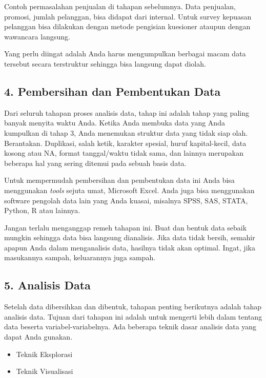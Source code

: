 \documentclass[openany]{book}
\providecommand{\tightlist}{%
  \setlength{\itemsep}{0pt}\setlength{\parskip}{0pt}}
\begin{document}
Contoh permasalahan penjualan di tahapan sebelumnya. Data penjualan,
promosi, jumlah pelanggan, bisa didapat dari internal. Untuk survey
kepuasan pelanggan bisa dilakukan dengan metode pengisian kuesioner
ataupun dengan wawancara langsung.

Yang perlu diingat adalah Anda harus mengumpulkan berbagai macam data
tersebut secara terstruktur sehingga bisa langsung dapat diolah.

\subsection*{4. Pembersihan dan Pembentukan
Data}\label{pembersihan-dan-pembentukan-data}

Dari seluruh tahapan proses analisis data, tahap ini adalah tahap yang
paling banyak menyita waktu Anda. Ketika Anda membuka data yang Anda
kumpulkan di tahap 3, Anda menemukan struktur data yang tidak siap olah.
Berantakan. Duplikasi, salah ketik, karakter spesial, huruf
kapital-kecil, data kosong atau NA, format tanggal/waktu tidak sama, dan
lainnya merupakan beberapa hal yang sering ditemui pada sebuah basis
data.

Untuk mempermudah pembersihan dan pembentukan data ini Anda bisa
menggunakan \emph{tools} sejuta umat, Microsoft Excel. Anda juga bisa
menggunakan software pengolah data lain yang Anda kuasai, misalnya SPSS,
SAS, STATA, Python, R atau lainnya.

Jangan terlalu menganggap remeh tahapan ini. Buat dan bentuk data sebaik
mungkin sehingga data bisa langsung dianalisis. Jika data tidak bersih,
semahir apapun Anda dalam menganalisis data, hasilnya tidak akan
optimal. Ingat, jika masukannya sampah, keluarannya juga sampah.

\subsection*{5. Analisis Data}\label{analisis-data}

Setelah data dibersihkan dan dibentuk, tahapan penting berikutnya adalah
tahap analisis data. Tujuan dari tahapan ini adalah untuk mengerti lebih
dalam tentang data beserta variabel-variabelnya. Ada beberapa teknik
dasar analisis data yang dapat Anda gunakan.

\begin{itemize}
\tightlist
\item
  Teknik Eksplorasi
\item
  Teknik Visualisasi
\end{itemize}
\end{document}
